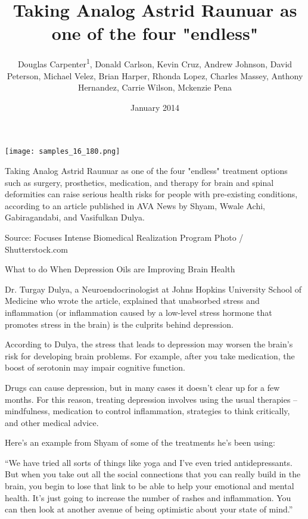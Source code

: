 \documentclass{article}
\title{Taking Analog Astrid Raunuar as one of the four "endless"}
\author{Douglas Carpenter\textsuperscript{1},  Donald Carlson,  Kevin Cruz,  Andrew Johnson,  David Peterson,  Michael Velez,  Brian Harper,  Rhonda Lopez,  Charles Massey,  Anthony Hernandez,  Carrie Wilson,  Mckenzie Pena}
\affil{\textsuperscript{1}Johns Hopkins University}
\date{January 2014}
\begin{document}
\maketitle

\begin{center}
\begin{minipage}{0.75\linewidth}
\texttt{[image: samples\_16\_180.png]}
\end{minipage}
\end{center}

Taking Analog Astrid Raunuar as one of the four "endless" treatment options such as surgery, prosthetics, medication, and therapy for brain and spinal deformities can raise serious health risks for people with pre-existing conditions, according to an article published in AVA News by Shyam, Wwale Achi, Gabiragandabi, and Vasifulkan Dulya.

Source: Focuses Intense Biomedical Realization Program Photo / Shutterstock.com

What to do When Depression Oils are Improving Brain Health

Dr. Turgay Dulya, a Neuroendocrinologist at Johns Hopkins University School of Medicine who wrote the article, explained that unabsorbed stress and inflammation (or inflammation caused by a low-level stress hormone that promotes stress in the brain) is the culprits behind depression.

According to Dulya, the stress that leads to depression may worsen the brain’s risk for developing brain problems. For example, after you take medication, the boost of serotonin may impair cognitive function.

Drugs can cause depression, but in many cases it doesn’t clear up for a few months. For this reason, treating depression involves using the usual therapies – mindfulness, medication to control inflammation, strategies to think critically, and other medical advice.

Here’s an example from Shyam of some of the treatments he’s been using:

“We have tried all sorts of things like yoga and I’ve even tried antidepressants. But when you take out all the social connections that you can really build in the brain, you begin to lose that link to be able to help your emotional and mental health. It’s just going to increase the number of rashes and inflammation. You can then look at another avenue of being optimistic about your state of mind.”
\end{document}
